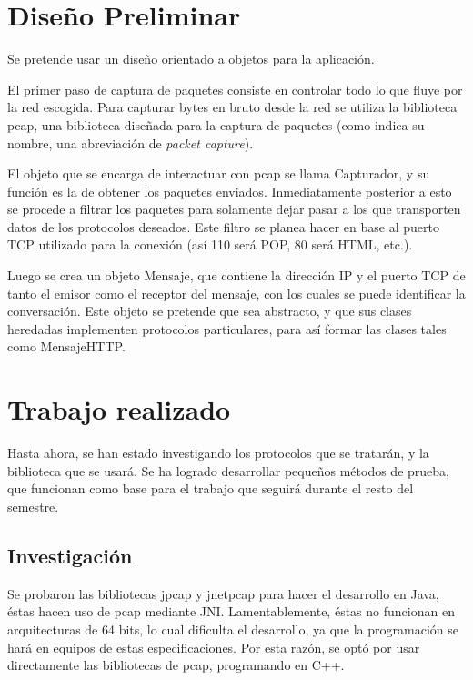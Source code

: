 \documentclass[titlepage]{article}
\begin{document}
\section{Dise\~no Preliminar}

Se pretende usar un dise\~no orientado a objetos para la aplicación.

El primer paso de captura de paquetes consiste en controlar todo lo que fluye
por la red escogida. Para capturar bytes en bruto desde la red se utiliza la
biblioteca \textsf{pcap}, una biblioteca dise\~nada para la captura de
paquetes (como indica su nombre, una abreviaci\'on de \emph{packet capture}).

El objeto que se encarga de interactuar con \textsf{pcap} se llama
\textsf{Capturador}, y su funci\'on es la de  obtener los paquetes enviados.
Inmediatamente posterior a esto se procede a filtrar los paquetes para
solamente dejar pasar a los que transporten datos de los protocolos deseados.
Este filtro se planea hacer en base al puerto TCP utilizado para la conexión
(as\'i 110 ser\'a POP, 80 ser\'a HTML, etc.).

Luego se crea un objeto \textsf{Mensaje}, que contiene la direcci\'on IP y el
puerto TCP de tanto el emisor como el receptor del mensaje, con los cuales se
puede identificar la conversaci\'on. Este objeto se pretende que sea
abstracto, y que sus clases heredadas implementen protocolos particulares,
para as\'i formar las clases tales como \textsf{MensajeHTTP}.

\section{Trabajo realizado}

Hasta ahora, se han estado investigando los protocolos que se tratar\'an, y la
biblioteca que se usar\'a. Se ha logrado desarrollar peque\~nos m\'etodos de
prueba, que funcionan como base para el trabajo que seguir\'a durante el resto
del semestre.

\subsection{Investigaci\'on}

Se probaron las bibliotecas \textsf{jpcap} y \textsf{jnetpcap} para hacer el
desarrollo en Java, \'estas hacen uso de \textsf{pcap} mediante JNI.
Lamentablemente, \'estas no funcionan en arquitecturas de 64 bits, lo cual
dificulta el desarrollo, ya que la programaci\'on se har\'a en equipos de
estas especificaciones. Por esta raz\'on, se opt\'o por usar directamente las
bibliotecas de \textsf{pcap}, programando en C++.
\end{document}
